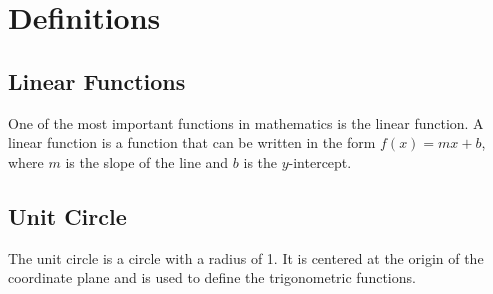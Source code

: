 \chapter{Definitions}
\section{Linear Functions}
One of the most important functions in mathematics is the linear function. A linear function is a function that can be written in the form $f(x) = mx + b$, where $m$ is the slope of the line and $b$ is the $y$-intercept.

\section{Unit Circle}
The unit circle is a circle with a radius of 1. It is centered at the origin of the coordinate plane and is used to define the trigonometric functions.


